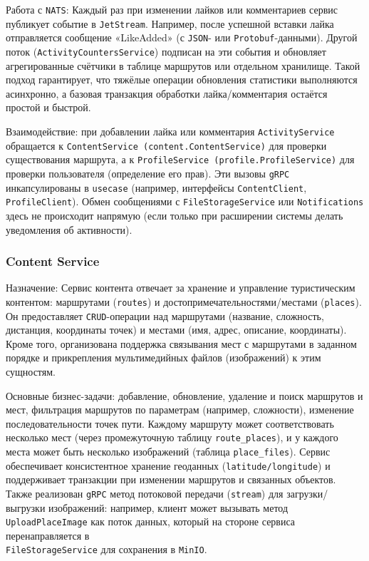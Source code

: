 Работа с \texttt{NATS}: Каждый раз при изменении лайков или комментариев сервис публикует событие в \texttt{JetStream}. Например, после успешной вставки лайка отправляется сообщение «LikeAdded» (с \texttt{JSON}- или \texttt{Protobuf}-данными). Другой поток (\texttt{ActivityCountersService}) подписан на эти события и обновляет агрегированные счётчики в таблице маршрутов или отдельном хранилище. Такой подход гарантирует, что тяжёлые операции обновления статистики выполняются асинхронно, а базовая транзакция обработки лайка/комментария остаётся простой и быстрой. 

Взаимодействие: при добавлении лайка или комментария \texttt{ActivityService} обращается к \texttt{ContentService (content.ContentService)} для проверки существования маршрута, а к \texttt{ProfileService (profile.ProfileService)} для проверки пользователя (определение его прав). Эти вызовы \texttt{gRPC} инкапсулированы в \texttt{usecase} (например, интерфейсы \texttt{ContentClient}, \texttt{ProfileClient}). Обмен сообщениями с \texttt{FileStorageService} или \texttt{Notifications} здесь не происходит напрямую (если только при расширении системы делать уведомления об активности).

\subsubsection*{Content Service}
Назначение: Сервис контента отвечает за хранение и управление туристическим контентом: маршрутами (\texttt{routes}) и достопримечательностями/местами (\texttt{places}). Он предоставляет \texttt{CRUD}-операции над маршрутами (название, сложность, дистанция, координаты точек) и местами (имя, адрес, описание, координаты). Кроме того, организована поддержка связывания мест с маршрутами в заданном порядке и прикрепления мультимедийных файлов (изображений) к этим сущностям.

Основные бизнес-задачи: добавление, обновление, удаление и поиск маршрутов и мест, фильтрация маршрутов по параметрам (например, сложности), изменение последовательности точек пути. Каждому маршруту может соответствовать несколько мест (через промежуточную таблицу \texttt{route\_places}), и у каждого места может быть несколько изображений (таблица \texttt{place\_files}). Сервис обеспечивает консистентное хранение геоданных (\texttt{latitude/longitude}) и поддерживает транзакции при изменении маршрутов и связанных объектов. Также реализован \texttt{gRPC} метод потоковой передачи (\texttt{stream}) для загрузки/выгрузки изображений: например, клиент может вызывать метод \\ \texttt{UploadPlaceImage} как поток данных, который на стороне сервиса перенаправляется в \\ \texttt{FileStorageService} для сохранения в \texttt{MinIO}.

